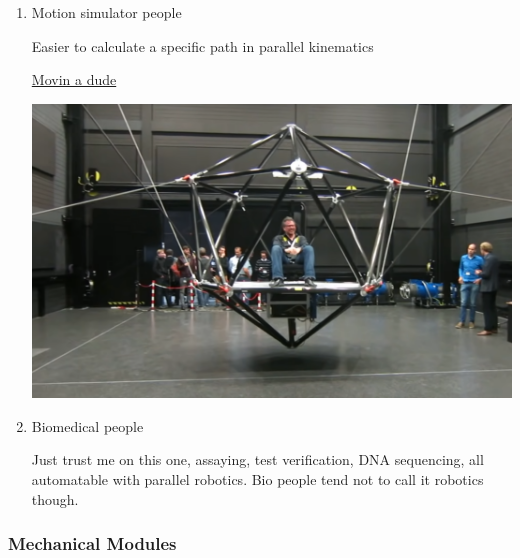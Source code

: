 \documentclass[11pt]{article}
\begin{document}
\begin{enumerate}
\begin{enumerate}
\item Motion simulator people
\label{sec:orgc69fc1f}

Easier to calculate a specific path in parallel kinematics

\href{https://www.youtube.com/watch?v=9KMptw7ZgVI\&t=1s}{Movin a dude}

\begin{center}
\includegraphics[width=.9\linewidth]{Applications/2022-07-18_13-03-17_screenshot.png}
\end{center}

\item Biomedical people
\label{sec:orge99f0cd}

Just trust me on this one, assaying, test verification, DNA sequencing, all automatable with parallel robotics. Bio people tend not to call it robotics though.
\end{enumerate}
\end{enumerate}

\subsubsection{Mechanical Modules}
\label{sec:org93a5323}
\end{document}
